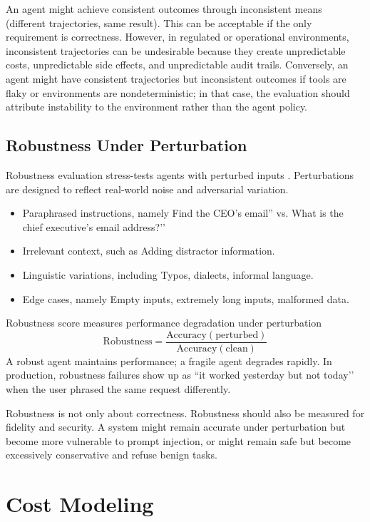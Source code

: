An agent might achieve consistent outcomes through inconsistent means (different trajectories, same result). This can be acceptable if the only requirement is correctness. However, in regulated or operational environments, inconsistent trajectories can be undesirable because they create unpredictable costs, unpredictable side effects, and unpredictable audit trails. Conversely, an agent might have consistent trajectories but inconsistent outcomes if tools are flaky or environments are nondeterministic; in that case, the evaluation should attribute instability to the environment rather than the agent policy.

\subsection{Robustness Under Perturbation}

Robustness evaluation stress-tests agents with perturbed inputs \cite{agentevalsurvey2025}. Perturbations are designed to reflect real-world noise and adversarial variation.

\begin{itemize}
\item Paraphrased instructions, namely Find the CEO's email'' vs. What is the chief executive’s email address?’’
\item Irrelevant context, such as Adding distractor information.
\item Linguistic variations, including Typos, dialects, informal language.
\item Edge cases, namely Empty inputs, extremely long inputs, malformed data.
\end{itemize}

Robustness score measures performance degradation under perturbation
\[
\text{Robustness} = \frac{\text{Accuracy}(\text{perturbed})}{\text{Accuracy}(\text{clean})}
\]
A robust agent maintains performance; a fragile agent degrades rapidly. In production, robustness failures show up as ``it worked yesterday but not today’’ when the user phrased the same request differently.

Robustness is not only about correctness. Robustness should also be measured for fidelity and security. A system might remain accurate under perturbation but become more vulnerable to prompt injection, or might remain safe but become excessively conservative and refuse benign tasks.

\section{Cost Modeling}

